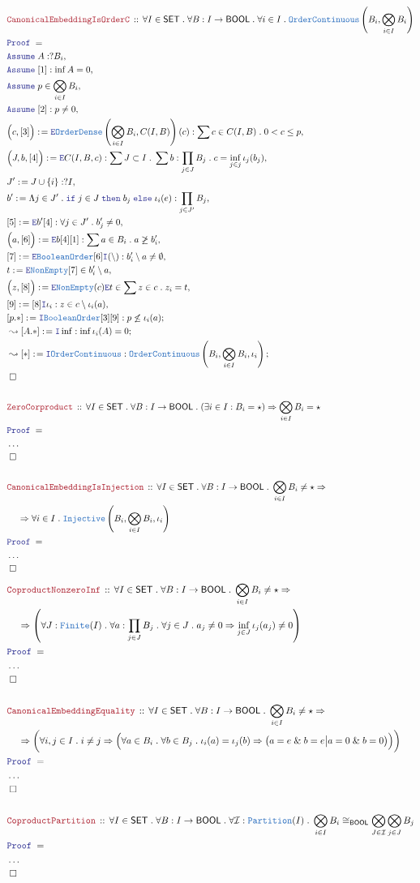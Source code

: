\documentclass[12pt]{scrartcl}
\newcommand{\TYPE}[1]{\textcolor{NavyBlue}{\mathtt{#1}}}
\newcommand{\LOGIC}[1]{\textcolor{Blue}{\mathtt{#1}}}
\newcommand{\THM}[1]{\textcolor{Maroon}{\mathtt{#1}}}
\renewcommand{\.}{\; . \;}
\newcommand{\de}{: \kern 0.1pc =}
\newcommand{\If}{\LOGIC{if} \;}
\newcommand{\Then}{ \; \LOGIC{then} \;}
\newcommand{\Else}{\; \LOGIC{else} \;}
\newcommand{\Theorem}[2]{& \THM{#1} \, :: \, #2 \\ & \Proof = \\ }
\newcommand{\NewLine}{\\ & \kern 1pc}
\newcommand{\Page}[1]{ \begin{align*} #1 \end{align*}   }
\newcommand{\NoProof}{ & \ldots \\ \EndProof}
\renewcommand{\And}{\; \& \;}
\newcommand{\Imply}{\Rightarrow}
\newcommand{\Intro}{\LOGIC{I}}
\newcommand{\Elim}{\LOGIC{E}}
\newcommand{\Inj}{\TYPE{Injective}}
\newcommand{\Say}[3]{& #1 \de #2 : #3, \\}
\newcommand{\SayIn}[3]{& #1 \de #2 \in #3, \\}
\newcommand{\Conclude}[3]{& #1 \de #2 : #3; \\}
\newcommand{\DeriveConclude}[3]{& \leadsto #1 \de #2 : #3 ; \\}
\newcommand{\Assume}[2]{& \LOGIC{Assume} \; #1 : #2, \\}
\newcommand{\AssumeIn}[2]{& \LOGIC{Assume} \; #1 \in #2, \\}
\newcommand{\QED}{\; \square}
\newcommand{\EndProof}{& \QED \\}
\newcommand{\Proof}{\LOGIC{Proof} \; }
\newcommand{\I}{\mathcal{I}}
\newcommand{\SET}{\mathsf{SET}}
\newcommand{\oC}{\TYPE{OrderContinuous}}
\newcommand{\OD}{\TYPE{OrderDense}}
\newcommand{\BOOL}{\mathsf{BOOL}}
\begin{document}
\Page{
	\Theorem{CanonicalEmbeddingIsOrderC}
	{
		\forall I \in \SET \.
		\forall B : I \to \BOOL \.
		\forall i \in I \.
		\oC\left( B_i, \bigotimes_{i \in I} B_i \right)
	}
	\Assume{A}{?B_i}
	\Assume{[1]}{\inf A = 0}
	\AssumeIn{p}{\bigotimes_{i \in I} B_i}
	\Assume{[2]}{p \neq 0}
	\Say{\Big(c,[3]\Big)}{\Elim \OD\left( \bigotimes_{i \in I} B_i, C(I,B) \right)(c)}
	{
		\sum c \in C(I,B) \. 0 < c \le p
	}
	\Say{\Big(J,b,[4] \Big)}{\Elim C(I,B,c)}
	{
		\sum J \subset I \. 
		\sum b : \prod_{j \in J} B_j \.
		c = \inf_{j \in j} \iota_j(b_j)
	}
	\Say{J'}{J \cup \{i\}}{?I}
	\Say{b'}{\Lambda j \in J' \. \If j \in J \Then b_j \Else \iota_i(e) }
	{
		\prod_{j \in J'} B_j
	}
	\Say{[5]}{\Elim b'[4]}{\forall j \in J' \. b'_j \neq 0}
	\Say{\Big( a, [6] \Big)}{\Elim b [4][1]}
	{
		\sum a \in B_i \.  a \not \ge b'_i	
	}
	\Say{[7]}{\Elim \TYPE{BooleanOrder}[6]\Intro (\setminus)}
	{b'_i \setminus a \neq \emptyset }
	\SayIn{t}{\Elim \TYPE{NonEmpty}[7]}{b'_i \setminus a}
	\SayIn{\Big(z, [8]\Big)}{\Elim \TYPE{NonEmpty}(c)\Elim t}{ \sum z \in c \. z_i = t}
	\Say{[9]}{[8] \Intro \iota_i}{z \in c \setminus \iota_i(a) }
	\Conclude{[p.*]}{\Intro \TYPE{BooleanOrder}[3][9]}
	{
		p \not \le \iota_i(a)
	}
	\DeriveConclude{[A.*]}{\Intro \inf}{\inf \iota_i(A) = 0}
	\DeriveConclude{[*]}{\Intro \oC}{\oC\left( B_i, \bigotimes_{i \in I} B_i,\iota_i\right)}
	\EndProof
	\\
	\Theorem{ZeroCorproduct}
	{
		\forall I \in \SET \.
		\forall B : I \to \BOOL \.
		(\exists i \in I : B_i = \star)
		\Imply
		\bigotimes_{i \in I} B_i = \star
	}
	\NoProof
	\\
	\Theorem{CanonicalEmbeddingIsInjection}
	{
		\forall I \in \SET \.
		\forall B : I \to \BOOL \.
		\bigotimes_{i \in I} B_i \neq \star
		\Imply
		\NewLine 
		\Imply		
		\forall i \in I \. 
		\Inj\left( B_i, \bigotimes_{i \in I} B_i, \iota_i \right)
	}
	\NoProof
}
\Page{
	\Theorem{CoproductNonzeroInf}
	{
		\forall I \in \SET \.
		\forall B : I \to \BOOL \.
		\bigotimes_{i \in I} B_i \neq \star
		\Imply
		\NewLine
		\Imply
		\left(		
			\forall J : \TYPE{Finite}(I) \.
			\forall a : \prod_{j \in J} B_j \.
			\forall j \in J \. a_j \neq 0 
			\Imply
			\inf_{j \in J} \iota_j(a_j) \neq 0 
		\right)
	}
	\NoProof
	\\
	\Theorem{CanonicalEmbeddingEquality}
	{
		\forall I \in \SET \.
		\forall B : I \to \BOOL \.
		\bigotimes_{i \in I} B_i \neq \star
		\Imply
		\NewLine
		\Imply
		\bigg(		
			\forall i,j \in I \.
			i \neq j 
			\Imply
			\Big(
				\forall a \in B_i \.
				\forall b \in B_j \. 
				\iota_i(a) = \iota_j(b) 
				\Imply
				\big(
					a = e \And b = e
					\big|
					a = 0 \And b = 0 
				\big)
			\Big)
		\bigg)
	}
	\NoProof
	\\
	\Theorem{CoproductPartition}
	{
		\forall I \in \SET \.
		\forall B : I \to \BOOL \.
		\forall \I : \TYPE{Partition}(I) \.
		\bigotimes_{i \in I} B_i 
		\cong_\BOOL \bigotimes_{J \in \I} \bigotimes_{j \in J} B_j 
	}
	\NoProof
}
\newpage
\end{document}
